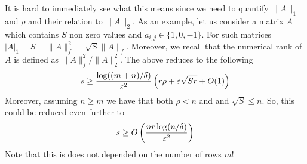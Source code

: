 \documentclass{article}
\begin{document}
It is hard to immediately see what this means since we need to quantify $\|A\|_1$ and $\rho$ and their relation to $\|A\|_2$.
As an example, let us consider a matrix $A$ which contains $S$ non zero values and $a_{i,j} \in \{1,0,-1\}$.
For such matrices $|A|_1 = S = \|A\|_f^2  =\sqrt{S}\|A\|_f$. Moreover,  we recall that the numerical rank of $A$ is defined as $\|A\|_f^2/\|A\|_2^2$.
The above reduces to the following
\[
s \ge \frac{\log((m+n)/\delta)}{\varepsilon^2}\left(r\rho +\varepsilon\sqrt{Sr}+ O(1)\right)
\]
Moreover, assuming $n \ge m$ we have that both $\rho < n$ and  and $\sqrt{S} \le n$. So, this could be reduced even further to  
\[
s \ge O\left(\frac{nr \log(n/\delta)}{\varepsilon^2}\right)
\]
Note that this is does not depended on the number of rows $m$!




\end{document}
